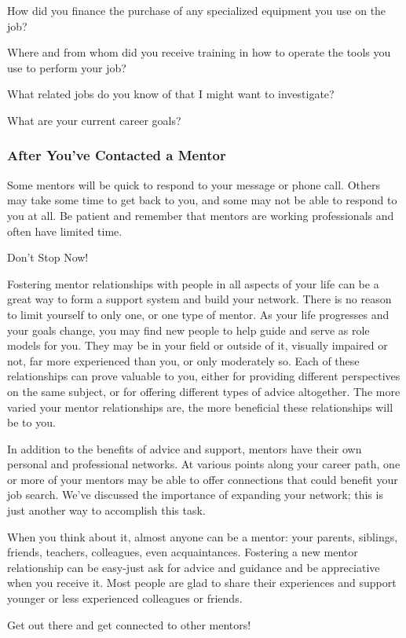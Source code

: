 How did you finance the purchase of any specialized equipment you use on the job?

Where and from whom did you receive training in how to operate the tools you use to perform your job? 

What related jobs do you know of that I might want to investigate?

What are your current career goals?

\subsubsection*{After You've Contacted a Mentor}
Some mentors will be quick to respond to your message or phone call. Others may take some time to get back to you, and some may not be able to respond to you at all. Be patient and remember that mentors are working professionals and often have limited time.

Don't Stop Now!

Fostering mentor relationships with people in all aspects of your life can be a great way to form a support system and build your network. There is no reason to limit yourself to only one, or one type of mentor. As your life progresses and your goals change, you may find new people to help guide and serve as role models for you. They may be in your field or outside of it, visually impaired or not, far more experienced than you, or only moderately so. Each of these relationships can prove valuable to you, either for providing different perspectives on the same subject, or for offering different types of advice altogether. The more varied your mentor relationships are, the more beneficial these relationships will be to you.

In addition to the benefits of advice and support, mentors have their own personal and professional networks. At various points along your career path, one or more of your mentors may be able to offer connections that could benefit your job search. We've discussed the importance of expanding your network; this is just another way to accomplish this task.

When you think about it, almost anyone can be a mentor: your parents, siblings, friends, teachers, colleagues, even acquaintances. Fostering a new mentor relationship can be easy-just ask for advice and guidance and be appreciative when you receive it. Most people are glad to share their experiences and support younger or less experienced colleagues or friends.

Get out there and get connected to other mentors!
 
